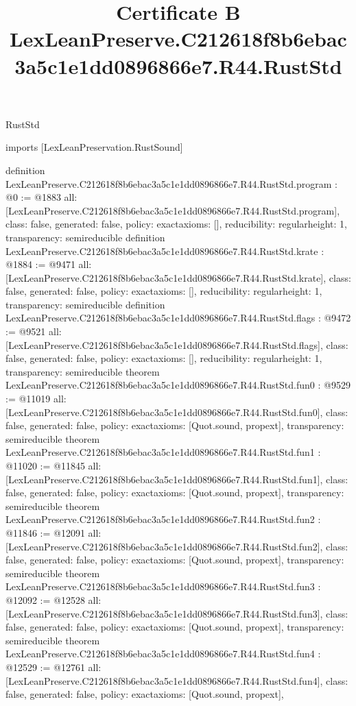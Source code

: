 \begin{lexlean}{RustStd}
\title{Certificate B LexLeanPreserve.C212618f8b6ebac3a5c1e1dd0896866e7.R44.RustStd}
\begin{coremodule}
imports [LexLeanPreservation.RustSound]

definition LexLeanPreserve.C212618f8b6ebac3a5c1e1dd0896866e7.R44.RustStd.program : @0 := @1883 {
  all: [LexLeanPreserve.C212618f8b6ebac3a5c1e1dd0896866e7.R44.RustStd.program],
  class: false,
  generated: false,
  policy: exact{axioms: []},
  reducibility: regular{height: 1},
  transparency: semireducible
}
definition LexLeanPreserve.C212618f8b6ebac3a5c1e1dd0896866e7.R44.RustStd.krate : @1884 := @9471 {
  all: [LexLeanPreserve.C212618f8b6ebac3a5c1e1dd0896866e7.R44.RustStd.krate],
  class: false,
  generated: false,
  policy: exact{axioms: []},
  reducibility: regular{height: 1},
  transparency: semireducible
}
definition LexLeanPreserve.C212618f8b6ebac3a5c1e1dd0896866e7.R44.RustStd.flags : @9472 := @9521 {
  all: [LexLeanPreserve.C212618f8b6ebac3a5c1e1dd0896866e7.R44.RustStd.flags],
  class: false,
  generated: false,
  policy: exact{axioms: []},
  reducibility: regular{height: 1},
  transparency: semireducible
}
theorem LexLeanPreserve.C212618f8b6ebac3a5c1e1dd0896866e7.R44.RustStd.fun0 : @9529 := @11019 {
  all: [LexLeanPreserve.C212618f8b6ebac3a5c1e1dd0896866e7.R44.RustStd.fun0],
  class: false,
  generated: false,
  policy: exact{axioms: [Quot.sound, propext]},
  transparency: semireducible
}
theorem LexLeanPreserve.C212618f8b6ebac3a5c1e1dd0896866e7.R44.RustStd.fun1 : @11020 := @11845 {
  all: [LexLeanPreserve.C212618f8b6ebac3a5c1e1dd0896866e7.R44.RustStd.fun1],
  class: false,
  generated: false,
  policy: exact{axioms: [Quot.sound, propext]},
  transparency: semireducible
}
theorem LexLeanPreserve.C212618f8b6ebac3a5c1e1dd0896866e7.R44.RustStd.fun2 : @11846 := @12091 {
  all: [LexLeanPreserve.C212618f8b6ebac3a5c1e1dd0896866e7.R44.RustStd.fun2],
  class: false,
  generated: false,
  policy: exact{axioms: [Quot.sound, propext]},
  transparency: semireducible
}
theorem LexLeanPreserve.C212618f8b6ebac3a5c1e1dd0896866e7.R44.RustStd.fun3 : @12092 := @12528 {
  all: [LexLeanPreserve.C212618f8b6ebac3a5c1e1dd0896866e7.R44.RustStd.fun3],
  class: false,
  generated: false,
  policy: exact{axioms: [Quot.sound, propext]},
  transparency: semireducible
}
theorem LexLeanPreserve.C212618f8b6ebac3a5c1e1dd0896866e7.R44.RustStd.fun4 : @12529 := @12761 {
  all: [LexLeanPreserve.C212618f8b6ebac3a5c1e1dd0896866e7.R44.RustStd.fun4],
  class: false,
  generated: false,
  policy: exact{axioms: [Quot.sound, propext]},
}
\end{coremodule}
\end{lexlean}
